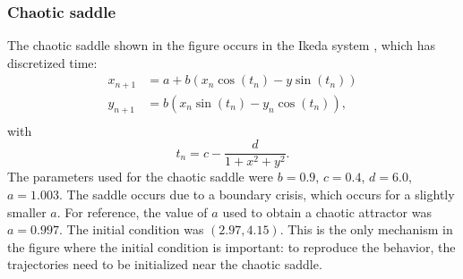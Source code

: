 \documentclass[reprint,superscriptaddress,showpacs,amsmath,amssymb,aps,floatfix,nolongbibliography]{revtex4-2}
\theoremstyle{definition}
\begin{document}

\subsubsection{Chaotic saddle}
The chaotic saddle shown in the figure occurs in the Ikeda system \cite{alligood1997book}, which has discretized time:
\begin{align}
    x_{n+1} &= a+b(x_n \cos(t_n) - y \sin(t_n)) \\ 
    y_{n+1} &= b(x_n \sin(t_n) - y_n \cos(t_n)), \\ 
\end{align}
with 
\begin{equation}
    t_n = c - \frac{d}{1 + x^2 + y^2}.
\end{equation}
The parameters used for the chaotic saddle were $b = 0.9$, $c = 0.4$, $d = 6.0$, $a = 1.003$. The saddle occurs due to a boundary crisis, which occurs for a slightly smaller $a$. For reference, the value of $a$ used to obtain a chaotic attractor was $a = 0.997$. The initial condition was $(2.97, 4.15)$. This is the only mechanism in the figure where the initial condition is important: to reproduce the behavior, the trajectories need to be initialized near the chaotic saddle.






\end{document}
